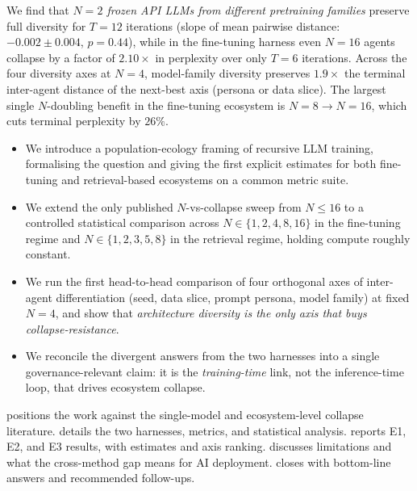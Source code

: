 We find that \emph{$N{=}2$ frozen API LLMs from different pretraining
families} preserve full diversity for $T{=}12$ iterations
(slope of mean pairwise distance: $-0.002 \pm 0.004$, $p = 0.44$),
while in the fine-tuning harness even $N{=}16$ agents collapse by a
factor of $2.10\times$ in perplexity over only $T{=}6$ iterations.
Across the four diversity axes at $N{=}4$, model-family diversity
preserves $\mathbf{1.9\times}$ the terminal inter-agent distance of the
next-best axis (persona or data slice). The largest single $N$-doubling
benefit in the fine-tuning ecosystem is \mbox{$N{=}8 \to N{=}16$}, which
cuts terminal perplexity by $26\%$.

\begin{itemize}[leftmargin=*,itemsep=0pt,topsep=0pt]
    \item We introduce a population-ecology framing of recursive
    LLM training, formalising the \mvp question and giving the first
    explicit \mvp estimates for both fine-tuning and retrieval-based
    ecosystems on a common metric suite.
    \item We extend the only published $N$-vs-collapse sweep
    \citep{hodel2026epistemic} from $N \le 16$ to a controlled
    statistical comparison across $N \in \{1, 2, 4, 8, 16\}$ in the
    fine-tuning regime and $N \in \{1, 2, 3, 5, 8\}$ in the retrieval
    regime, holding compute roughly constant.
    \item We run the first head-to-head comparison of four orthogonal
    axes of inter-agent differentiation (seed, data slice, prompt
    persona, model family) at fixed $N{=}4$, and show that
    \emph{architecture diversity is the only axis that buys
    collapse-resistance}.
    \item We reconcile the divergent answers from the two harnesses
    into a single governance-relevant claim: it is the
    \emph{training-time} link, not the inference-time loop, that drives
    ecosystem collapse.
\end{itemize}

 positions the work against the single-model and
ecosystem-level collapse literature.  details
the two harnesses, metrics, and statistical analysis.
 reports E1, E2, and E3 results, with \mvp
estimates and axis ranking.  discusses
limitations and what the cross-method gap means for AI deployment.
 closes with bottom-line answers and
recommended follow-ups.
